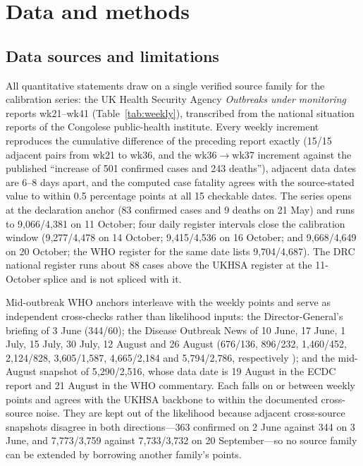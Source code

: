 \documentclass[preprint,12pt,numbers]{elsarticle}
\begin{document}
\section{Data and methods}\label{sec:methods}

\subsection{Data sources and limitations}\label{sec:data}

All quantitative statements draw on a single verified source family for
the calibration series: the UK Health Security Agency \emph{Outbreaks
under monitoring} reports wk21--wk41 (Table~\ref{tab:weekly}),
transcribed from the national situation reports of the Congolese
public-health institute. Every weekly increment reproduces the
cumulative difference of the preceding report exactly (15/15 adjacent
pairs from wk21 to wk36, and the wk36$\to$wk37 increment against the
published ``increase of 501 confirmed cases and 243 deaths''), adjacent
data dates are 6--8 days apart, and the computed case fatality agrees
with the source-stated value to within 0.5 percentage points at all 15
checkable dates. The series opens at the declaration anchor (83
confirmed cases and 9 deaths on 21 May) and runs to
9{,}066/4{,}381 on 11 October; four daily register intervals close the
calibration window (9{,}277/4{,}478 on 14 October;
9{,}415/4{,}536 on 16 October; and
9{,}668/4{,}649 on 20 October; the WHO register for the same date lists 9{,}704/4{,}687). The DRC national
register runs about 88 cases above the UKHSA register at the
11-October splice and is not spliced with it.

Mid-outbreak WHO anchors interleave with the weekly points and serve as
independent cross-checks rather than likelihood inputs: the
Director-General's briefing of 3 June (344/60); the
Disease Outbreak News of 10 June, 17 June, 1 July, 15 July, 30 July, 12
August and 26 August (676/136, 896/232, 1{,}460/452, 2{,}124/828,
3{,}605/1{,}587, 4{,}665/2{,}184 and 5{,}794/2{,}786, respectively
);
and the mid-August snapshot of 5{,}290/2{,}516, whose data date is 19
August in the ECDC report and 21 August in the WHO commentary. Each falls on or between weekly points and
agrees with the UKHSA backbone to within the documented cross-source
noise. They are kept out of the likelihood because adjacent
cross-source snapshots disagree in both directions---363 confirmed on 2
June against 344 on 3 June, and 7{,}773/3{,}759 against 7{,}733/3{,}732
on 20 September---so no source family can be
extended by borrowing another family's points.
\end{document}
